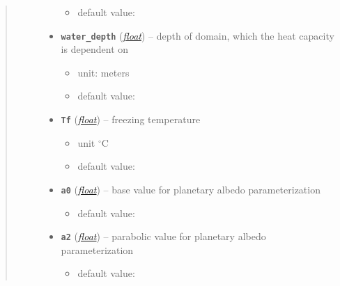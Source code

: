 \documentclass[letterpaper,10pt,english]{sphinxmanual}
\begin{document}
\begin{fulllineitems}
\begin{quote}
\begin{description}
\begin{itemize}
\begin{itemize}
\item {} 
default value: 

\end{itemize}


\item {} 
\textbf{\texttt{water\_depth}} (\href{http://docs.python.org/2.7/library/functions.html\#float}{\emph{float}}) -- 
depth of {\hyperref[api/climlab.domain:climlab.domain.domain.zonal_mean_surface]{\emph{}}}
domain, which the heat capacity is dependent on
\begin{itemize}
\item {} 
unit: meters

\item {} 
default value: 

\end{itemize}


\item {} 
\textbf{\texttt{Tf}} (\href{http://docs.python.org/2.7/library/functions.html\#float}{\emph{float}}) -- 
freezing temperature
\begin{itemize}
\item {} 
unit \(^{\circ} \textrm{C}\)

\item {} 
default value: 

\end{itemize}


\item {} 
\textbf{\texttt{a0}} (\href{http://docs.python.org/2.7/library/functions.html\#float}{\emph{float}}) -- 
base value for planetary albedo parameterization
{\hyperref[api/climlab.surface:climlab.surface.albedo.StepFunctionAlbedo]{\emph{}}}
\begin{itemize}
\item {} 
default value: 

\end{itemize}


\item {} 
\textbf{\texttt{a2}} (\href{http://docs.python.org/2.7/library/functions.html\#float}{\emph{float}}) -- 
parabolic value for planetary  albedo parameterization
{\hyperref[api/climlab.surface:climlab.surface.albedo.StepFunctionAlbedo]{\emph{}}}
\begin{itemize}
\item {} 
default value: 

\end{itemize}



\end{itemize}
\end{description}
\end{quote}
\end{fulllineitems}
\end{document}

